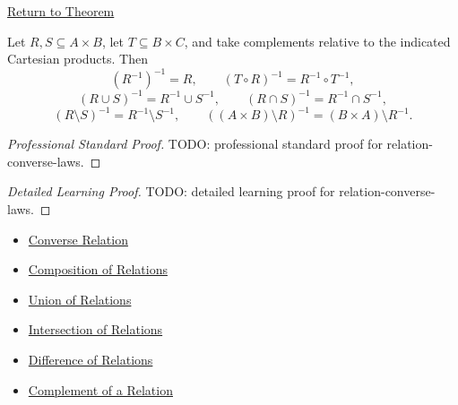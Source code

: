 \newpage
{}
\label{prf:relation-converse-laws}

\begin{remark*}[Return]
\hyperref[thm:relation-converse-laws]{Return to Theorem}
\end{remark*}

\begin{theorem*}
Let $R,S\subseteq A\times B$, let $T\subseteq B\times C$, and take complements
relative to the indicated Cartesian products. Then
\[
(R^{-1})^{-1}=R,\qquad
(T\circ R)^{-1}=R^{-1}\circ T^{-1},
\]
\[
(R\cup S)^{-1}=R^{-1}\cup S^{-1},\qquad
(R\cap S)^{-1}=R^{-1}\cap S^{-1},
\]
\[
(R\setminus S)^{-1}=R^{-1}\setminus S^{-1},\qquad
((A\times B)\setminus R)^{-1}=(B\times A)\setminus R^{-1}.
\]
\end{theorem*}

\begin{proof}[Professional Standard Proof]
\LRAProofBodyStart
TODO: professional standard proof for relation-converse-laws.
\end{proof}

\begin{proof}[Detailed Learning Proof]
\LRAProofBodyStart
TODO: detailed learning proof for relation-converse-laws.
\end{proof}

\begin{remark*}

\end{remark*}

\begin{dependencies}
\begin{itemize}
  \item \hyperref[def:converse-relation]{Converse Relation}
  \item \hyperref[def:relation-composition]{Composition of Relations}
  \item \hyperref[def:relation-union]{Union of Relations}
  \item \hyperref[def:relation-intersection]{Intersection of Relations}
  \item \hyperref[def:relation-difference]{Difference of Relations}
  \item \hyperref[def:relation-complement]{Complement of a Relation}
\end{itemize}
\end{dependencies}

\clearpage
